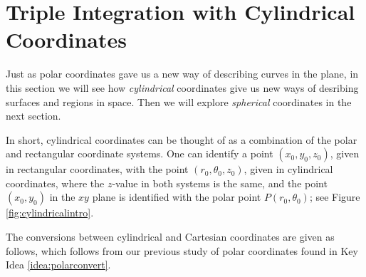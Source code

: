 \section{Triple Integration with Cylindrical Coordinates}\label{sec:cylindrical}

Just as polar coordinates gave us a new way of describing curves in the plane, in this section we will see how \emph{cylindrical} coordinates give us new ways of desribing surfaces and regions in space.  Then we will explore \emph{spherical} coordinates in the next section.

In short, cylindrical coordinates can be thought of as a combination of the polar and rectangular coordinate systems. %
One can identify a point $(x_0,y_0,z_0)$, given in rectangular coordinates, with the point $(r_0,\theta_0,z_0)$, given in cylindrical coordinates, where the $z$-value in both systems is the same, and the point $(x_0,y_0)$ in the $xy$ plane is identified with the polar point $P(r_0,\theta_0)$; see Figure \ref{fig:cylindricalintro}.

The conversions between cylindrical and Cartesian coordinates are given as follows, which follows from our previous study of polar coordinates found in Key Idea \ref{idea:polarconvert}.\\

\\

